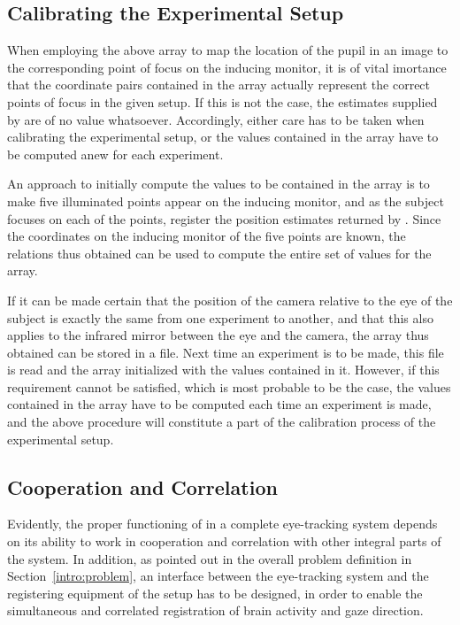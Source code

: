 \subsection{Calibrating the Experimental Setup}
\label{algo:future:calibrate}

When employing the above array to map the location of the pupil in an
image to the corresponding point of focus on the inducing monitor, it
is of vital imortance that the coordinate pairs contained in the array
actually represent the correct points of focus in the given setup.  If
this is not the case, the estimates supplied by {\octopus} are of no
value whatsoever.  Accordingly, either care has to be taken when
calibrating the experimental setup, or the values contained in the
array have to be computed anew for each experiment.

An approach to initially compute the values to be contained in the
array is to make five illuminated points appear on the inducing
monitor, and as the subject focuses on each of the points, register
the position estimates returned by {\octopus}.  Since the coordinates
on the inducing monitor of the five points are known, the relations
thus obtained can be used to compute the entire set of values for the
array.

If it can be made certain that the position of the camera relative to
the eye of the subject is exactly the same from one experiment to
another, and that this also applies to the infrared mirror between the
eye and the camera, the array thus obtained can be stored in a file.
Next time an experiment is to be made, this file is read and the array
initialized with the values contained in it.  However, if this
requirement cannot be satisfied, which is most probable to be the
case, the values contained in the array have to be computed each time
an experiment is made, and the above procedure will constitute a part
of the calibration process of the experimental setup.

\subsection{Cooperation and Correlation}
\label{algo:future:cooperate}

Evidently, the proper functioning of {\octopus} in a complete
eye-tracking system depends on its ability to work in cooperation and
correlation with other integral parts of the system.  In addition, as
pointed out in the overall problem definition in
Section~\ref{intro:problem}, an interface between the eye-tracking
system and the registering equipment of the setup has to be designed,
in order to enable the simultaneous and correlated registration of
brain activity and gaze direction.

